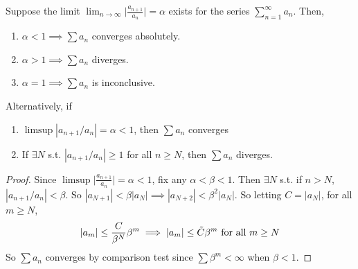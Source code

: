   \begin{theorem}
    Suppose the limit $\lim_{n\rightarrow \infty} \big| \frac{a_{n+1}}{a_n} \big| = \alpha$ exists for the series $\sum_{n=1}^\infty a_n$. Then, 
    \begin{enumerate}
      \item $\alpha < 1 \implies \sum a_n$ converges absolutely. 
      \item $\alpha > 1 \implies \sum a_n$ diverges.
      \item $\alpha = 1 \implies \sum a_n$ is inconclusive. 
    \end{enumerate}
    Alternatively, if 
    \begin{enumerate}
      \item $\limsup |a_{n+1}/a_n| = \alpha < 1$, then $\sum a_n$ converges 
      \item If $\exists N$ s.t. $|a_{n+1}/a_n| \geq 1$ for all $n \geq N$, then $\sum a_n$ diverges. 
    \end{enumerate}
  \end{theorem}
  \begin{proof}
    Since $\limsup \big| \frac{a_{n+1}}{a_n} \big| = \alpha < 1$, fix any $\alpha < \beta < 1$. Then $\exists N$ s.t. if $n > N$, $|a_{n+1}/a_n| < \beta$. So $|a_{N+1}| < \beta |a_N| \implies |a_{N+2}| < \beta^2 |a_N|$. So letting $C = |a_N|$, for all $m \geq N$, 
    \begin{equation}
      |a_m| \leq \frac{C}{\beta^N} \beta^m \implies |a_m| \leq \Tilde{C} \beta^m \text{ for all } m \geq N
    \end{equation}
    So $\sum a_n$ converges by comparison test since $\sum \beta^m < \infty$ when $\beta < 1$. 
  \end{proof}

